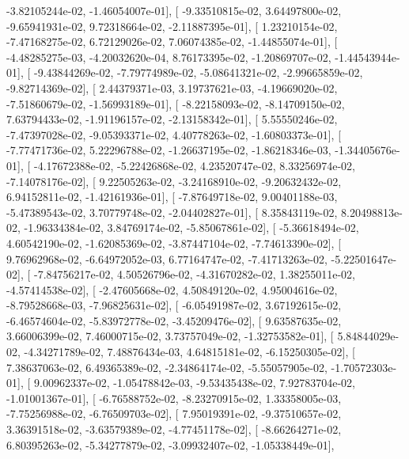 \documentclass{article}
\begin{document}
         -3.82105244e-02,  -1.46054007e-01],
       [ -9.33510815e-02,   3.64497800e-02,  -9.65941931e-02,
          9.72318664e-02,  -2.11887395e-01],
       [  1.23210154e-02,  -7.47168275e-02,   6.72129026e-02,
          7.06074385e-02,  -1.44855074e-01],
       [ -4.48285275e-03,  -4.20032620e-04,   8.76173395e-02,
         -1.20869707e-02,  -1.44543944e-01],
       [ -9.43844269e-02,  -7.79774989e-02,  -5.08641321e-02,
         -2.99665859e-02,  -9.82714369e-02],
       [  2.44379371e-03,   3.19737621e-03,  -4.19669020e-02,
         -7.51860679e-02,  -1.56993189e-01],
       [ -8.22158093e-02,  -8.14709150e-02,   7.63794433e-02,
         -1.91196157e-02,  -2.13158342e-01],
       [  5.55550246e-02,  -7.47397028e-02,  -9.05393371e-02,
          4.40778263e-02,  -1.60803373e-01],
       [ -7.77471736e-02,   5.22296788e-02,  -1.26637195e-02,
         -1.86218346e-03,  -1.34405676e-01],
       [ -4.17672388e-02,  -5.22426868e-02,   4.23520747e-02,
          8.33256974e-02,  -7.14078176e-02],
       [  9.22505263e-02,  -3.24168910e-02,  -9.20632432e-02,
          6.94152811e-02,  -1.42161936e-01],
       [ -7.87649718e-02,   9.00401188e-03,  -5.47389543e-02,
          3.70779748e-02,  -2.04402827e-01],
       [  8.35843119e-02,   8.20498813e-02,  -1.96334384e-02,
          3.84769174e-02,  -5.85067861e-02],
       [ -5.36618494e-02,   4.60542190e-02,  -1.62085369e-02,
         -3.87447104e-02,  -7.74613390e-02],
       [  9.76962968e-02,  -6.64972052e-03,   6.77164747e-02,
         -7.41713263e-02,  -5.22501647e-02],
       [ -7.84756217e-02,   4.50526796e-02,  -4.31670282e-02,
          1.38255011e-02,  -4.57414538e-02],
       [ -2.47605668e-02,   4.50849120e-02,   4.95004616e-02,
         -8.79528668e-03,  -7.96825631e-02],
       [ -6.05491987e-02,   3.67192615e-02,  -6.46574604e-02,
         -5.83972778e-02,  -3.45209476e-02],
       [  9.63587635e-02,   3.66006399e-02,   7.46000715e-02,
          3.73757049e-02,  -1.32753582e-01],
       [  5.84844029e-02,  -4.34271789e-02,   7.48876434e-03,
          4.64815181e-02,  -6.15250305e-02],
       [  7.38637063e-02,   6.49365389e-02,  -2.34864174e-02,
         -5.55057905e-02,  -1.70572303e-01],
       [  9.00962337e-02,  -1.05478842e-03,  -9.53435438e-02,
          7.92783704e-02,  -1.01001367e-01],
       [ -6.76588752e-02,  -8.23270915e-02,   1.33358005e-03,
         -7.75256988e-02,  -6.76509703e-02],
       [  7.95019391e-02,  -9.37510657e-02,   3.36391518e-02,
         -3.63579389e-02,  -4.77451178e-02],
       [ -8.66264271e-02,   6.80395263e-02,  -5.34277879e-02,
         -3.09932407e-02,  -1.05338449e-01],
\end{document}
